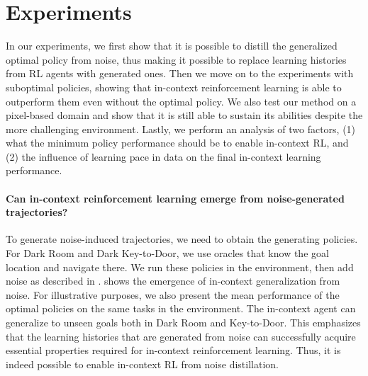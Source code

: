 \documentclass{article}
\theoremstyle{plain}
\theoremstyle{definition}
\theoremstyle{remark}
\begin{document}
\section{Experiments}
\label{sec:exp}
In our experiments, we first show that it is possible to distill the generalized optimal policy from noise, thus making it possible to replace learning histories from RL agents with generated ones. Then we move on to the experiments with suboptimal policies, showing that in-context reinforcement learning is able to outperform them even without the optimal policy. We also test our method on a pixel-based domain and show that it is still able to sustain its abilities despite the more challenging environment. Lastly, we perform an analysis of two factors, (1) what the minimum policy performance should be to enable in-context RL, and (2) the influence of learning pace in data on the final in-context learning performance.
\paragraph{Can in-context reinforcement learning emerge from noise-generated trajectories?}
\label{para:optimal_exp}
To generate noise-induced trajectories, we need to obtain the generating policies. For Dark Room and Dark Key-to-Door, we use oracles that know the goal location and navigate there. We run these policies in the environment, then add noise as described in .
 shows the emergence of in-context generalization from noise. For illustrative purposes, we also present the mean performance of the optimal policies on the same tasks in the environment. The in-context agent can generalize to unseen goals both in Dark Room and Key-to-Door. This emphasizes that the learning histories that are generated from noise can successfully acquire essential properties required for in-context reinforcement learning. Thus, it is indeed possible to enable in-context RL from noise distillation.
\end{document}
